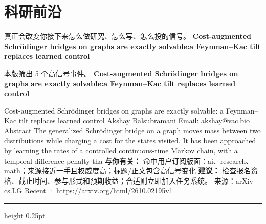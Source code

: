 \documentclass[10.5pt]{ctexart}
\begin{document}
\section*{科研前沿}
{\color{ormuted} 真正会改变你接下来怎么做研究、怎么写、怎么投的信号。}
\vspace{2mm}
{\LARGE\bfseries Cost-augmented Schrödinger bridges on graphs are exactly solvable:a Feynman–Kac tilt replaces learned control}\par
\vspace{1mm}
{\color{ormuted} 本版筛出 5 个高信号事件。}
\vspace{3mm}
{\Large\bfseries Cost-augmented Schrödinger bridges on graphs are exactly solvable:a Feynman–Kac tilt replaces learned control}\par
Cost-augmented Schrödinger bridges on graphs are exactly solvable: a Feynman–Kac tilt replaces learned control Akshay Balsubramani Email: akshay@vac.bio Abstract The generalized Schrödinger bridge on a graph moves mass between two distributions while charging a cost for the states visited. It has been approached by learning the rates of a controlled continuous-time Markov chain, with a temporal-difference penalty tha
\textbf{与你有关：} 命中用户订阅版面：ai、research、math；来源接近一手且权威度高；标题/正文包含高信号变化
\textbf{建议：} 检查报名资格、截止时间、参与形式和预期收益；合适则立即加入任务系统。
{\footnotesize\color{ormuted} 来源：arXiv cs.LG Recent · \url{https://arxiv.org/html/2610.02195v1}}
\vspace{4mm}
\hrule height 0.25pt
\vspace{3mm}
\end{document}
